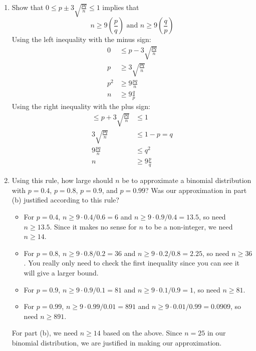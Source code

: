 \documentclass[12pt]{article}
\begin{document}
\begin{enumerate}
\begin{enumerate}
\item Show that $0 \leq p \pm 3 \sqrt{\frac{pq}{n}} \leq 1$ implies that
\[
n \geq 9\left( \frac{p}{q} \right) \text{ and } n \geq 9\left( \frac{q}{p} \right)
\]
Using the left inequality with the minus sign:
\begin{align*}
0 &\leq p - 3 \sqrt{\frac{pq}{n}}\\
p &\geq 3 \sqrt{\frac{pq}{n}}\\
p^2 &\geq 9 \frac{pq}{n} \\
n &\geq 9 \frac{q}{p}
\end{align*}
Using the right inequality with the plus sign:
\begin{align*}
\leq p + 3 \sqrt{\frac{pq}{n}} &\leq 1 \\
3 \sqrt{\frac{pq}{n}} &\leq 1 - p = q \\
9 \frac{pq}{n} &\leq q^2 \\
n &\geq 9 \frac{p}{q}
\end{align*}

\item Using this rule, how large should $n$ be to approximate a binomial distribution with $p = 0.4$, $p = 0.8$, $p = 0.9$, and $p = 0.99$? Was our approximation in part (b) justified according to this rule?\\

\begin{itemize}[noitemsep]
\item For $p = 0.4$, $n \geq 9 \cdot 0.4/0.6 = 6$ and $n \geq 9 \cdot 0.9/0.4 = 13.5$, so need $n \geq 13.5$. Since it makes no sense for $n$ to be a non-integer, we need $n \geq 14$.
\item For $p = 0.8$, $n \geq 9 \cdot 0.8/0.2 = 36$ and $n \geq 9 \cdot 0.2/0.8 = 2.25$, so need $n \geq 36$. You really only need to check the first inequality since you can see it will give a larger bound.
\item For $p = 0.9$, $n \geq 9 \cdot 0.9/0.1 = 81$ and $n \geq 9 \cdot 0.1/0.9 = 1$, so need $n \geq 81$.
\item For $p = 0.99$, $n \geq 9 \cdot 0.99/0.01 = 891$ and $n \geq 9 \cdot 0.01/0.99 = 0.0909$, so need $n \geq 891$.
\end{itemize}
For part (b), we need $n \geq 14$ based on the above. Since $n = 25$ in our binomial distribution, we are justified in making our approximation.
\end{enumerate}

\end{enumerate}
\end{document}
